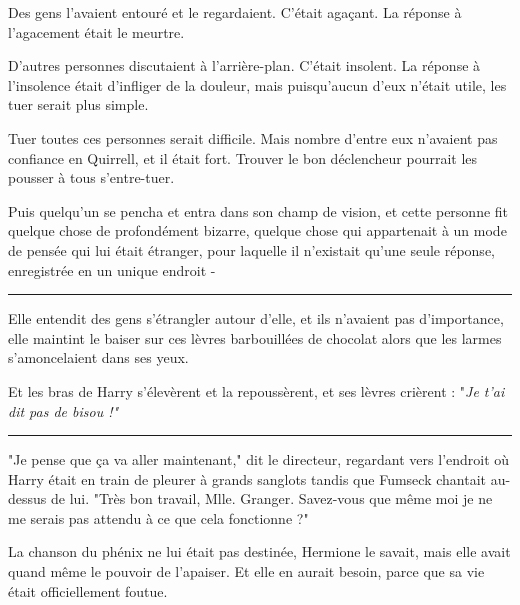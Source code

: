Des gens l'avaient entouré et le regardaient. C'était agaçant. La réponse à l'agacement était le meurtre.

D'autres personnes discutaient à l'arrière-plan. C'était insolent. La réponse à l'insolence était d'infliger de la douleur, mais puisqu'aucun d'eux n'était utile, les tuer serait plus simple.

Tuer toutes ces personnes serait difficile. Mais nombre d'entre eux n'avaient pas confiance en Quirrell, et il était fort. Trouver le bon déclencheur pourrait les pousser à tous s'entre-tuer.

Puis quelqu'un se pencha et entra dans son champ de vision, et cette personne fit quelque chose de profondément bizarre, quelque chose qui appartenait à un mode de pensée qui lui était étranger, pour laquelle il n'existait qu'une seule réponse, enregistrée en un unique endroit -
\par\noindent\rule{\textwidth}{0.4pt}
Elle entendit des gens s'étrangler autour d'elle, et ils n'avaient pas d'importance, elle maintint le baiser sur ces lèvres barbouillées de chocolat alors que les larmes s'amoncelaient dans ses yeux.

Et les bras de Harry s'élevèrent et la repoussèrent, et ses lèvres crièrent : "\emph{Je t'ai dit pas de bisou !"} 
\par\noindent\rule{\textwidth}{0.4pt}
"Je pense que ça va aller maintenant," dit le directeur, regardant vers l'endroit où Harry était en train de pleurer à grands sanglots tandis que Fumseck chantait au-dessus de lui. "Très bon travail, Mlle. Granger. Savez-vous que même moi je ne me serais pas attendu à ce que cela fonctionne ?"

La chanson du phénix ne lui était pas destinée, Hermione le savait, mais elle avait quand même le pouvoir de l'apaiser. Et elle en aurait besoin, parce que sa vie était officiellement foutue.

